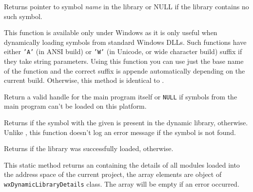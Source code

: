 Returns pointer to symbol {\it name} in the library or NULL if the library
contains no such symbol.




\label{wxdynamiclibrarygetsymbolaorw}


This function is available only under Windows as it is only useful when
dynamically loading symbols from standard Windows DLLs. Such functions have
either \texttt{'A'} (in ANSI build) or \texttt{'W'} (in Unicode, or wide
character build) suffix if they take string parameters. Using this function you
can use just the base name of the function and the correct suffix is appende
automatically depending on the current build. Otherwise, this method is
identical to .


\label{wxdynamiclibrarygetprogramhandle}


Return a valid handle for the main program itself or \texttt{NULL} if symbols
from the main program can't be loaded on this platform.


\label{wxdynamiclibraryhassymbol}


Returns \true if the symbol with the given  is present in the dynamic
library, \false otherwise. Unlike ,
this function doesn't log an error message if the symbol is not found.



\label{wxdynamiclibraryisloaded}


Returns \true if the library was successfully loaded, \false otherwise.


\label{wxdynamiclibrarylistloaded}


This static method returns an  containing the details
of all modules loaded into the address space of the current project, the array
elements are object of \texttt{wxDynamicLibraryDetails} class. The array will
be empty if an error occurred.

